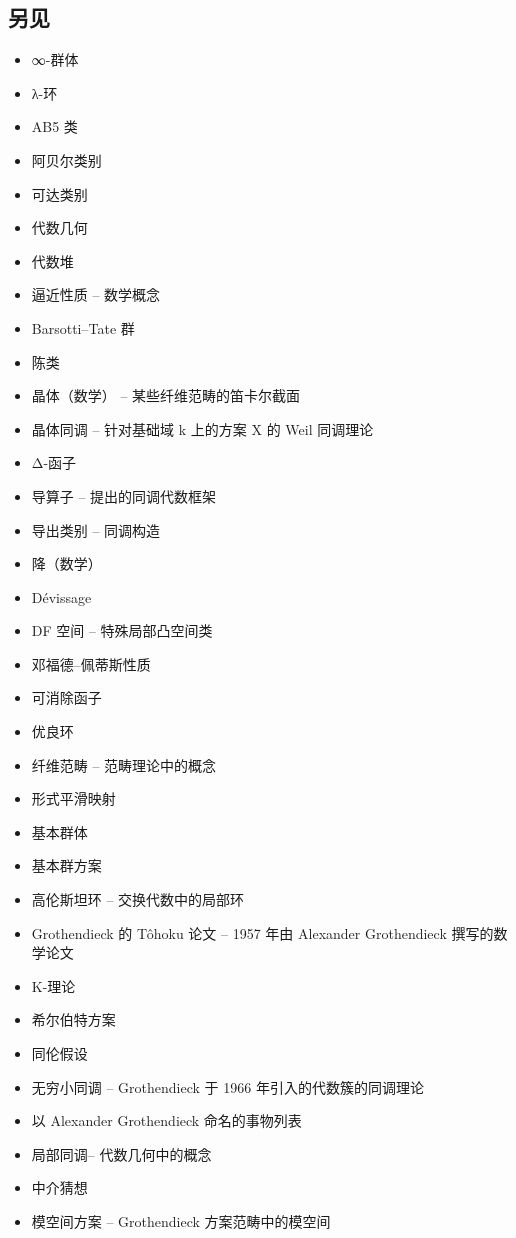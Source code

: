 \subsection{另见}  
\begin{itemize}
\item ∞-群体  
\item λ-环  
\item AB5 类  
\item 阿贝尔类别  
\item 可达类别  
\item 代数几何  
\item 代数堆  
\item 逼近性质 – 数学概念  
\item Barsotti–Tate 群  
\item 陈类  
\item 晶体（数学） – 某些纤维范畴的笛卡尔截面  
\item 晶体同调 – 针对基础域 k 上的方案 X 的 Weil 同调理论  
\item Δ-函子  
\item 导算子 – 提出的同调代数框架  
\item 导出类别 – 同调构造  
\item 降（数学）  
\item Dévissage  
\item DF 空间 – 特殊局部凸空间类  
\item 邓福德–佩蒂斯性质  
\item 可消除函子
\item 优良环  
\item 纤维范畴 – 范畴理论中的概念  
\item 形式平滑映射  
\item 基本群体  
\item 基本群方案  
\item 高伦斯坦环 – 交换代数中的局部环  
\item Grothendieck 的 Tôhoku 论文 – 1957 年由 Alexander Grothendieck 撰写的数学论文  
\item K-理论  
\item 希尔伯特方案  
\item 同伦假设  
\item 无穷小同调 – Grothendieck 于 1966 年引入的代数簇的同调理论  
\item 以 Alexander Grothendieck 命名的事物列表  
\item 局部同调– 代数几何中的概念  
\item 中介猜想  
\item 模空间方案 – Grothendieck 方案范畴中的模空间  

\end{itemize}
